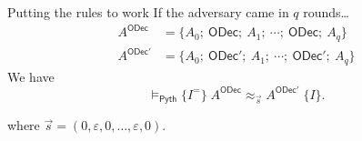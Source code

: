 \begin{frame}{Putting the rules to work}
  If the adversary came in $q$ rounds\ldots
  \begin{align*}
    A^{\mathsf{ODec}} &= \bigl\{
      A_0;\ \mathsf{ODec};\ A_1;\ \cdots;\ \mathsf{ODec};\ A_q\bigr\}
      \\[0.5em]
    A^{\mathsf{ODec}'} &= \bigl\{
      A_0;\ \mathsf{ODec}';\ A_1;\ \cdots;\ \mathsf{ODec}';\ A_q\bigr\}
  \end{align*}
  \medskip
  \pause
  We have
  \[
    \vDash_{\mathsf{Pyth}}\{I^{=}\}\;
      A^{\mathsf{ODec}}\approx_{\vec{s}} A^{\mathsf{ODec}'}\;\{I\}.
  \]
  \begin{center}
    {\small where $\vec{s}=(0,\varepsilon,0,\ldots,\varepsilon,0)$.}
  \end{center}
  \vspace{0.4em}
\end{frame}
